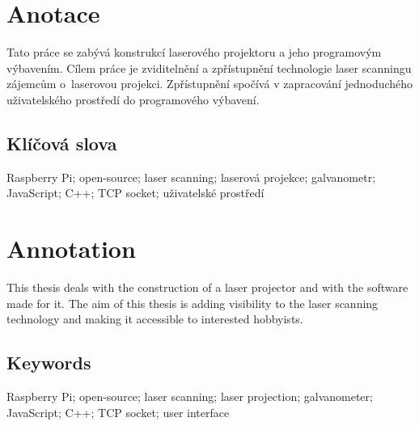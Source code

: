 \documentclass{template/socthesis}
\author{Šimon Hrouda}
\begin{document}
\newcommand{\bardgen}[3]{following text generated by~ai~(google bard) on~#1\\%
  \begin{tcolorbox}[breakable, colback=blue!20]
    #2
  \end{tcolorbox}
  \begin{tcolorbox}[breakable, colback=blue!10, colframe=white]
    #3
  \end{tcolorbox}
}


\maketitle



\pagestyle{empty}

\section*{Anotace}

Tato práce se zabývá konstrukcí laserového projektoru a jeho programovým výbavením.
Cílem práce je zviditelnění a zpřístupnění technologie laser scanningu zájemcům o~laserovou projekci.
Zpřístupnění spočívá v zapracování jednoduchého uživatelského prostředí do programového výbavení.

\subsection*{Klíčová slova}
Raspberry Pi; open-source; laser scanning; laserová projekce; galvanometr; JavaScript; C++; TCP socket; uživatelské prostředí

\vspace{20mm}

\section*{Annotation}
This thesis deals with the construction of a laser projector and with the software made for it.
The aim of this thesis is adding visibility to the laser scanning technology and making it accessible to interested hobbyists.

\subsection*{Keywords}
Raspberry Pi; open-source; laser scanning; laser projection; galvanometer; JavaScript; C++; TCP socket; user interface
\end{document}
